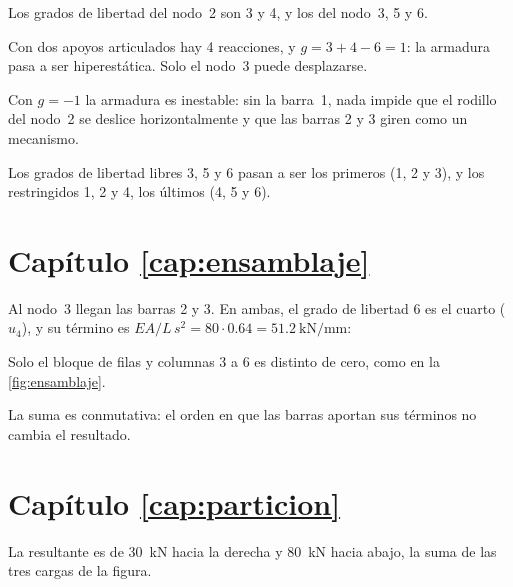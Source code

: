 Los grados de libertad del nodo~2 son 3 y 4, y los del nodo~3, 5 y 6.

Con dos apoyos articulados hay 4 reacciones, y $g = 3 + 4 - 6 = 1$: la
armadura pasa a ser hiperestática. Solo el nodo~3 puede desplazarse.

Con $g = -1$ la armadura es inestable: sin la barra~1, nada impide que el
rodillo del nodo~2 se deslice horizontalmente y que las barras 2 y 3 giren
como un mecanismo.

Los grados de libertad libres 3, 5 y 6 pasan a ser los primeros (1, 2 y 3),
y los restringidos 1, 2 y 4, los últimos (4, 5 y 6).

\section*{Capítulo \ref{cap:ensamblaje}}

Al nodo~3 llegan las barras 2 y 3. En ambas, el grado de libertad 6 es el
cuarto ($u_4$), y su término es $EA/L\,s^2 = 80 \cdot 0.64 =
\SI{51.2}{\kilo\newton\per\milli\metre}$:

Solo el bloque de filas y columnas 3 a 6 es distinto de cero, como en la
\cref{fig:ensamblaje}.


La suma es conmutativa: el orden en que las barras aportan sus términos no
cambia el resultado.

\section*{Capítulo \ref{cap:particion}}

La resultante es de \SI{30}{\kilo\newton} hacia la derecha y
\SI{80}{\kilo\newton} hacia abajo, la suma de las tres cargas de la figura.

